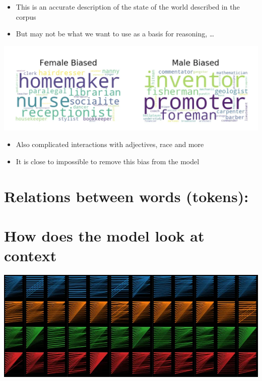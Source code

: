\documentclass[25pt,a4paper,landscape,headrule,footrule,xetex]{foils}
\begin{document}
\begin{itemize}
\item This is an accurate description of the state of the world described in the corpus
\item But may not be what we want to use as a basis for reasoning, \ldots
\end{itemize}



\noindent\includegraphics[width=\linewidth]{../pics/bias.png}

\begin{itemize}
\item Also complicated interactions with adjectives, race and more
\item It is close to impossible to remove this bias from the model
\end{itemize}

\section{Relations between words (tokens): }

\section{How does the model look at context}


\begin{center}
\includegraphics[width=\linewidth]{../pics/1_bdQ2iGgp7fEJh8Ul9Hg5uA.png}
\end{center}
\end{document}
